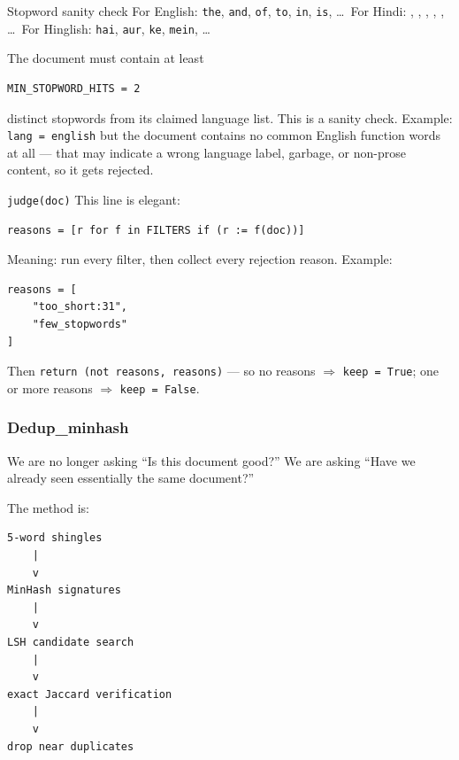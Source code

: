 \begin{paragraphblock}{Stopword sanity check}
  For English: \texttt{the}, \texttt{and}, \texttt{of}, \texttt{to},
  \texttt{in}, \texttt{is}, \ldots\
  For Hindi: , , , , , \ldots\
  For Hinglish: \texttt{hai}, \texttt{aur}, \texttt{ke}, \texttt{mein},
  \ldots\

  The document must contain at least
\begin{lstlisting}[style=shadedpython]
MIN_STOPWORD_HITS = 2
\end{lstlisting}
  distinct stopwords from its claimed language list. This is a sanity check.
  Example: \texttt{lang = english} but the document contains no common
  English function words at all --- that may indicate a wrong language
  label, garbage, or non-prose content, so it gets rejected.
\end{paragraphblock}

\begin{paragraphblock}{\texttt{judge(doc)}}
  This line is elegant:
\begin{lstlisting}[style=shadedpython]
reasons = [r for f in FILTERS if (r := f(doc))]
\end{lstlisting}
  Meaning: run every filter, then collect every rejection reason. Example:
\begin{lstlisting}[style=shadedpython]
reasons = [
    "too_short:31",
    "few_stopwords"
]
\end{lstlisting}
  Then \texttt{return (not reasons, reasons)} --- so no reasons $\Rightarrow$
  \texttt{keep = True}; one or more reasons $\Rightarrow$
  \texttt{keep = False}.
\end{paragraphblock}

\subsubsection{Dedup\_minhash}

We are no longer asking ``Is this document good?'' We are asking ``Have we
already seen essentially the same document?''

The method is:
\begin{lstlisting}[style=shadedpython,language={},basicstyle=\scriptsize\ttfamily]
5-word shingles
    |
    v
MinHash signatures
    |
    v
LSH candidate search
    |
    v
exact Jaccard verification
    |
    v
drop near duplicates
\end{lstlisting}

